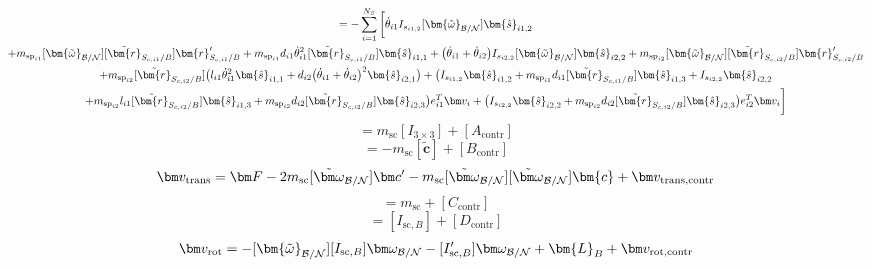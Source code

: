 \documentclass[paper]{aiaaNew}
\begin{document}
\begin{multline}
\end{multline}\begin{multline}
[v_{\text{rot,contr}}] = -\sum\limits_{i=1}^{N_S} \bigg[
\dot{\theta}_{i1} I_{s_{i1,2}} [\bm{\tilde{\omega}}_{\cal B/N}] \bm{\hat{s}}_{i1,2} 
\\+m_{\text{sp}_{i1}} [\bm{\tilde{\omega}}_{\cal B/N}] [\tilde{\bm{r}}_{S_{c,i1}/B}] \bm{r}'_{S_{c,i1}/B} +m_{\text{sp}_{i1}}d_{i1}\dot{\theta}_{i1}^2  [\tilde{\bm{r}}_{S_{c,i1}/B}] \bm{\hat{s}}_{i1,1}
+ \big(\dot{\theta}_{i1}+\dot{\theta}_{i2}\big) I_{s_{i2,2}}[\bm{\tilde{\omega}}_{\cal B/N}]\bm{\hat{s}}_{i2,2}
+m_{\text{sp}_{i2}} [\bm{\tilde{\omega}}_{\cal B/N}] [\tilde{\bm{r}}_{S_{c,i2}/B}] \bm{r}'_{S_{c,i2}/B} 	\\+m_{\text{sp}_{i2}} [\tilde{\bm{r}}_{S_{c,i2}/B}] \big(l_{i1} \dot{\theta}_{i1}^2 \bm{\hat{s}}_{i1,1} + d_{i2}\big(\dot{\theta}_{i1} + \dot{\theta}_{i2}\big)^2\bm{\hat{s}}_{i2,1}\big) +   \big(I_{s_{i1,2}}\bm{\hat{s}}_{i1,2}+m_{\text{sp}_{i1}}d_{i1} [\tilde{\bm{r}}_{S_{c,i1}/B}]   \bm{\hat{s}}_{i1,3} + I_{s_{i2,2}}\bm{\hat{s}}_{i2,2}\\
+m_{\text{sp}_{i2}}l_{i1} [\tilde{\bm{r}}_{S_{c,i2}/B}]  \bm{\hat{s}}_{i1,3}+m_{\text{sp}_{i2}}d_{i2} [\tilde{\bm{r}}_{S_{c,i2}/B}] \bm{\hat{s}}_{i2,3}\big)e_{i1}^T\bm v_i+\big( I_{s_{i2,2}}\bm{\hat{s}}_{i2,2}+m_{\text{sp}_{i2}} d_{i2} [\tilde{\bm{r}}_{S_{c,i2}/B}] \bm{\hat{s}}_{i2,3}\big)e_{i2}^T\bm v_i\bigg]
\end{multline}\begin{equation}
[A]  = m_\text{sc} [I_{3\times 3}] + [A_{\text{contr}}]
\end{equation}\begin{equation}
[B] = -m_\text{sc} [\tilde{\bm{c}}] + [B_{\text{contr}}]
\end{equation}\begin{equation}
\bm v_{\text{trans}} = \bm F - 2m_\text{sc} [\tilde{\bm\omega}_{\cal B/N}] \bm c'- m_\text{sc} [\tilde{\bm\omega}_{\cal B/N}][\tilde{\bm\omega}_{\cal B/N}]\bm{c} + \bm v_{\text{trans,contr}}
\end{equation}\begin{equation}
[C] = m_{\text{sc}} + [C_{\text{contr}}]
\end{equation}\begin{equation}
[D] =  [I_{\text{sc},B}] + [D_{\text{contr}}]
\end{equation}\begin{equation}
\bm v_{\text{rot}} = -[\bm{\tilde{\omega}}_{\cal B/N}] [I_{\text{sc},B}] \bm\omega_{\cal B/N} - [I'_{\text{sc},B}] \bm\omega_{\cal B/N} + \bm{L}_B + \bm v_{\text{rot,contr}}
\end{equation}
\end{document}
